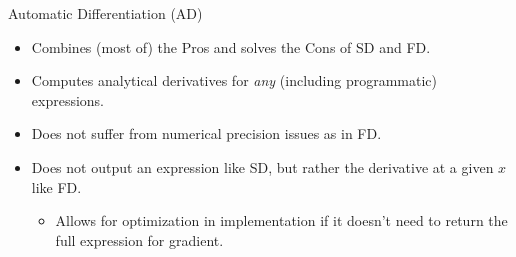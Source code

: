 \begin{frame}{Automatic Differentiation (AD)}
\begin{itemize}
    \item Combines (most of) the Pros and solves the Cons of SD and FD.
    \item Computes analytical derivatives for \emph{any} (including programmatic) expressions.
    \item Does not suffer from numerical precision issues as in FD.
    \item Does not output an expression like SD, but rather the derivative at a given $x$
    like FD.
    \begin{itemize}
        \item Allows for optimization in implementation if it doesn't need to return 
        the full expression for gradient.
    \end{itemize}
\end{itemize}
\end{frame}
